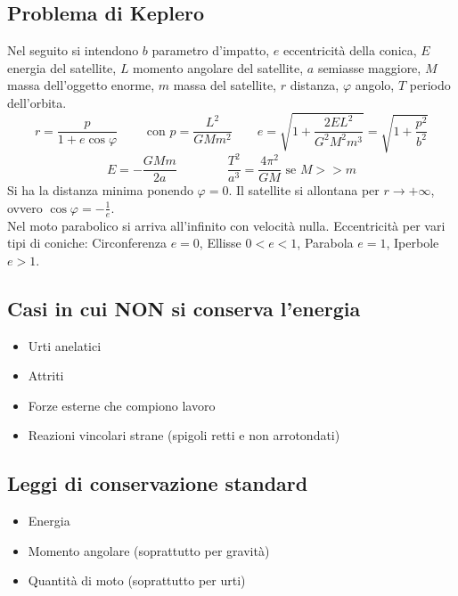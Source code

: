 \documentclass[a4paper,11pt]{article}
\newcommand{\qqquad}[0]{\qquad \qquad}
\begin{document}
\subsection*{Problema di Keplero}
Nel seguito si intendono $b$ parametro d'impatto, $e$ eccentricit\`a della conica, $E$ energia del satellite, $L$ momento angolare del satellite, $a$ semiasse maggiore, $M$ massa dell'oggetto enorme, $m$ massa del satellite, $r$ distanza, $\varphi$ angolo, $T$ periodo dell'orbita. \\
$$ r = \frac{p}{1+e\cos\varphi} \qquad \mbox{ con } p = \frac{L^2}{GMm^2} \qquad e = \sqrt{1+\frac{2EL^2}{G^2M^2m^3}} = \sqrt{1 + \frac{p^2}{b^2}}$$
$$ E = - \frac{GMm}{2a} \qqquad \frac{T^2}{a^3} = \frac{4\pi^2}{GM} \mbox{ se } M >> m$$
Si ha la distanza minima ponendo $\varphi = 0$. Il satellite si allontana per $r \rightarrow +\infty$, ovvero $\cos\varphi = -\frac{1}{e}$. \\ Nel moto parabolico si arriva all'infinito con velocit\`a nulla.
Eccentricit\`a per vari tipi di coniche: Circonferenza $e=0$, Ellisse $0<e<1$, Parabola $e=1$, Iperbole $e>1$.

\subsection*{Casi in cui NON si conserva l'energia}
\begin{itemize}
\item Urti anelatici
\item Attriti
\item Forze esterne che compiono lavoro
\item Reazioni vincolari strane (spigoli retti e non arrotondati)
\end{itemize}

\subsection*{Leggi di conservazione standard}
\begin{itemize}
\item Energia
\item Momento angolare (soprattutto per gravit\`a)
\item Quantit\`a di moto (soprattutto per urti)
\end{itemize}
\end{document}
